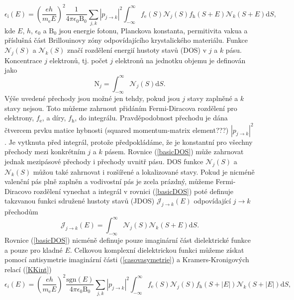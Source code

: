 \begin{equation}
\label{basicDOS}
\epsilon_\mathrm{i} (E) = 
\left(\frac{eh}{m_\mathrm{e}E} \right)^2 \frac{1}{4 \pi \epsilon_0 \mathrm{B}_0} \sum_{j,k} | p_{j \rightarrow k} |^2
\int_{-\infty}^\infty f_\mathrm{e}(S) \mathcal{N}_j(S) f_\mathrm{h}(S+E) \mathcal{N}_k(S + E)\mathrm{d}S \text{,}
\end{equation}
kde $E$, $h$, $\epsilon_0$ a $\mathrm{B}_0$ jsou energie fotonu, Planckova konstanta, permitivita vakua a příslušná část Brillouinovy zóny odpovídajícího krystalického materiálu. Funkce $\mathcal{N}_j(S)$ a $\mathcal{N}_k(S)$ značí rozdělení energií hustoty stavů (DOS) v $j$ a $k$ pásu. Koncentrace $j$ elektronů, tj. počet $j$ elektronů na jednotku objemu je definován jako
\begin{equation}
\mathrm{N}_j = \int_{-\infty}^\infty \mathcal{N}_j(S)\mathrm{d}S \text{.}
\end{equation}
Výše uvedené přechody jsou možné jen tehdy, pokud jsou $j$ stavy zaplněné a $k$ stavy nejsou. Toto můžeme zahrnout přidáním Fermi-Diracova rozdělení pro elektrony, $f_\mathrm{e}$, a díry, $f_\mathrm{h}$, do integrálu. Pravděpodobnost přechodu je dána čtvercem prvku matice hybnosti (squared momentum-matrix element???) $|p_{j \rightarrow k}|^2$. Je vytknuta před integrál, protože předpokládáme, že je konstantní pro všechny přechody mezi konkrétním $j$ a $k$ pásem. Rovnice (\ref{basicDOS}) může zahrnovat jednak mezipásové přechody i přechody uvnitř pásu. DOS funkce $\mathcal{N}_j(S)$ a $\mathcal{N}_k(S)$ můžou také zahrnovat i rozšířené a lokalizované stavy. Pokud je nicméně valenční pás plně zaplněn a vodivostní pás je zcela prázdný, můžeme Fermi-Diracovo rozdělení vynechat a integrál v rovnici (\ref{basicDOS}) poté definuje takzvanou funkci sdružené hustoty stavů (JDOS) $\mathcal{J}_{j \rightarrow k}(E)$ odpovídající $j \rightarrow k$ přechodům
\begin{equation}
\mathcal{J}_{j \rightarrow k}(E) = \int_{-\infty}^\infty \mathcal{N}_j(S) \mathcal{N}_k(S + E)\mathrm{d}S \text{.}
\end{equation}
Rovnice (\ref{basicDOS}) nicméně definuje pouze imaginární část dielektrické funkce a pouze pro kladné $E$. Celkovou komplexní dielektrickou funkci můžeme získat pomocí antisymetrie imaginární části (\ref{casovasymetrie}) a Kramers-Kronigových relací (\ref{KKint})
\begin{equation}
\label{basicDLC2}
\epsilon_i (E) = 
\left(\frac{eh}{m_\mathrm{e}E} \right)^2 \frac{\mathrm{sgn}(E)}{4 \pi \epsilon_0 \mathrm{B}_0} \sum_{j,k} | p_{j \rightarrow k} |^2
\int_{-\infty}^\infty f_\mathrm{e}(S) \mathcal{N}_j(S) f_\mathrm{h}(S+|E|) \mathcal{N}_k(S + |E|)\mathrm{d}S \text{,}
\end{equation}

